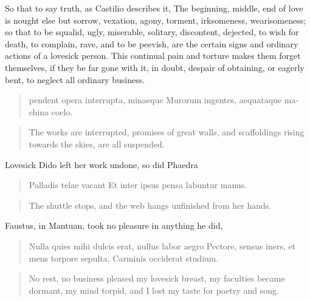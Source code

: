 So that to say truth, as Castilio describes it, The beginning,
middle, end of love is nought else but sorrow, vexation, agony,
torment, irksomeness, wearisomeness; so that to be squalid, ugly,
miserable, solitary, discontent, dejected, to wish for death, to
complain, rave, and to be peevish, are the certain signs and ordinary
actions of a lovesick person. This continual pain and torture makes
them forget themselves, if they be far gone with it, in doubt, despair
of obtaining, or eagerly bent, to neglect all ordinary business.

\begin{latin}
\begin{verse}
pendent opera interrupta, minaeque
Murorum ingentes, aequataque machina coelo.
\end{verse}
\end{latin}
\translationrule%
\begin{verse}%
The works are interrupted, promises of great walls,
and scaffoldings rising towards the skies, are all suspended.
\end{verse}%

Lovesick Dido left her work undone, so did Phaedra

\begin{latin}
\begin{verse}
Palladis telae vacant
Et inter ipsus pensa labuntur manus.
\end{verse}
\end{latin}
\translationrule%
\begin{verse}%
The shuttle stops,
and the web hangs unfinished from her hands.
\end{verse}%

Faustus, in Mantuan, took no pleasure in anything he did,

\begin{latin}
\begin{verse}
Nulla quies mihi dulcis erat, nullus labor aegro
Pectore, sensus iners, et mens torpore sepulta,
Carminis occiderat studium.
\end{verse}
\end{latin}
\translationrule%
\begin{verse}%
No rest, no business pleased my lovesick breast,
my faculties became dormant, my mind torpid,
and I lost my taste for poetry and song.
\end{verse}%

